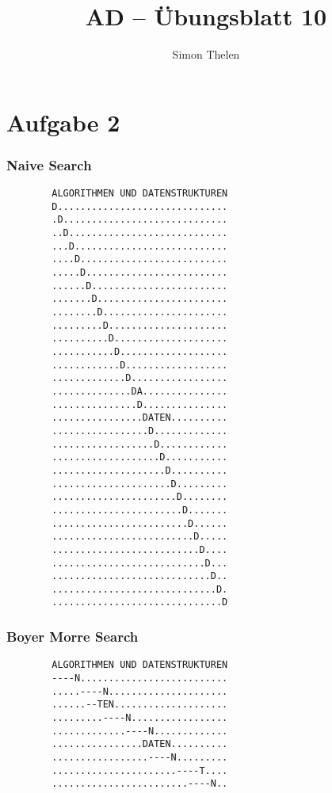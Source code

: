 \documentclass[a4paper, 11pt]{article}
\title{AD -- Übungsblatt 10}
\author{Simon Thelen}
\begin{document}
    \maketitle

    \section*{Aufgabe 2}
    \subsubsection*{Naive Search}
    \begin{lstlisting}
        ALGORITHMEN UND DATENSTRUKTUREN
        D..............................
        .D.............................
        ..D............................
        ...D...........................
        ....D..........................
        .....D.........................
        ......D........................
        .......D.......................
        ........D......................
        .........D.....................
        ..........D....................
        ...........D...................
        ............D..................
        .............D.................
        ..............DA...............
        ...............D...............
        ................DATEN..........
        .................D.............
        ..................D............
        ...................D...........
        ....................D..........
        .....................D.........
        ......................D........
        .......................D.......
        ........................D......
        .........................D.....
        ..........................D....
        ...........................D...
        ............................D..
        .............................D.
        ..............................D
    \end{lstlisting}

    \subsubsection*{Boyer Morre Search}
    \begin{lstlisting}
        ALGORITHMEN UND DATENSTRUKTUREN
        ----N..........................
        .....----N.....................
        ......--TEN....................
        .........----N.................
        .............----N.............
        ................DATEN..........
        .................----N.........
        ......................----T....
        ........................----N..
    \end{lstlisting}
\end{document}
